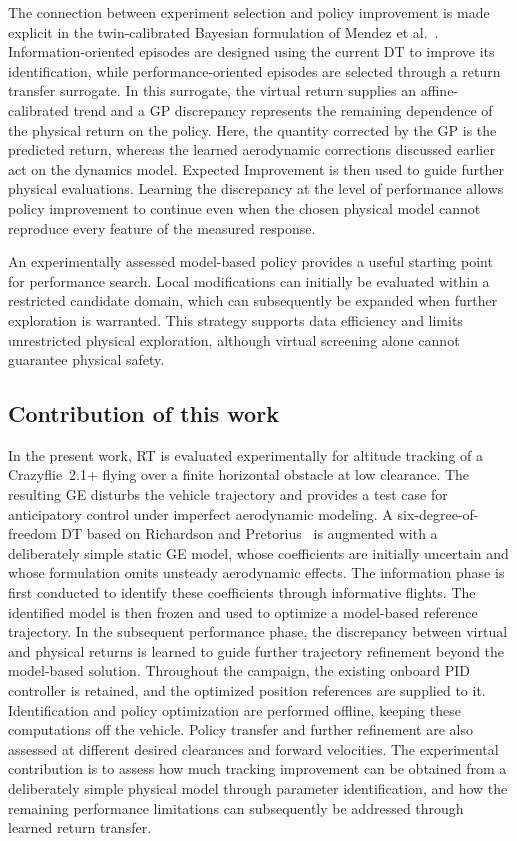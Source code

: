 \documentclass[journal]{IEEEtran}
\begin{document}
The connection between experiment selection and policy improvement is made explicit in the twin-calibrated Bayesian formulation of Mendez et al.~\cite{Mendez2026}. Information-oriented episodes are designed using the current DT to improve its identification, while performance-oriented episodes are selected through a return transfer surrogate. In this surrogate, the virtual return supplies an affine-calibrated trend and a GP discrepancy represents the remaining dependence of the physical return on the policy. Here, the quantity corrected by the GP is the predicted return, whereas the learned aerodynamic corrections discussed earlier act on the dynamics model. Expected Improvement is then used to guide further physical evaluations. Learning the discrepancy at the level of performance allows policy improvement to continue even when the chosen physical model cannot reproduce every feature of the measured response. 

An experimentally assessed model-based policy provides a useful starting point for performance search. Local modifications can initially be evaluated within a restricted candidate domain, which can subsequently be expanded when further exploration is warranted. This strategy supports data efficiency and limits unrestricted physical exploration, although virtual screening alone cannot guarantee physical safety.

\subsection{Contribution of this work}
In the present work, RT is evaluated experimentally for altitude tracking of a Crazyflie~2.1+ flying over a finite horizontal obstacle at low clearance. The resulting GE disturbs the vehicle trajectory and provides a test case for anticipatory control under imperfect aerodynamic modeling. A six-degree-of-freedom DT based on Richardson and Pretorius~\cite{Richardson2025} is augmented with a deliberately simple static GE model, whose coefficients are initially uncertain and whose formulation omits unsteady aerodynamic effects. The information phase is first conducted to identify these coefficients through informative flights. The identified model is then frozen and used to optimize a model-based reference trajectory. In the subsequent performance phase, the discrepancy between virtual and physical returns is learned to guide further trajectory refinement beyond the model-based solution. Throughout the campaign, the existing onboard PID controller is retained, and the optimized position references are supplied to it. Identification and policy optimization are performed offline, keeping these computations off the vehicle. Policy transfer and further refinement are also assessed at different desired clearances and forward velocities. The experimental contribution is to assess how much tracking improvement can be obtained from a deliberately simple physical model through parameter identification, and how the remaining performance limitations can subsequently be addressed through learned return transfer.
 
\end{document}
